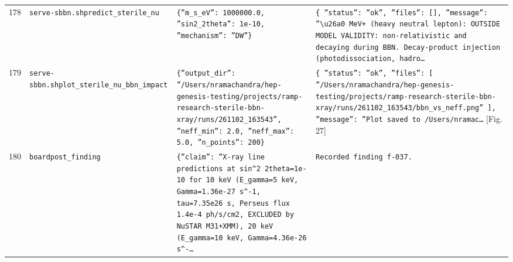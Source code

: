\documentclass[11pt,a4paper]{article}
\begin{document}
\begin{longtable}{@{}p{}p{}p{}p{}@{}}
178 & \texttt{serve-sbbn.sh}\newline\texttt{predict\_\allowbreak{}sterile\_\allowbreak{}nu} & \texttt{\{''m\_\allowbreak{}s\_\allowbreak{}eV'':\allowbreak{} 1000000.0,\allowbreak{} ''sin2\_\allowbreak{}2theta'':\allowbreak{} 1e-10,\allowbreak{} ''mechanism'':\allowbreak{} ''DW''\}\allowbreak{}} & \texttt{\{   ''status'':\allowbreak{} ''ok'',\allowbreak{}   ''files'':\allowbreak{} []\allowbreak{},\allowbreak{}   ''message'':\allowbreak{} ''\textbackslash{}\allowbreak{}u26a0 MeV+ (heavy neutral lepton)\allowbreak{}:\allowbreak{} OUTSIDE MODEL VALIDITY:\allowbreak{} non-relativistic and decaying during BBN. Decay-product injection (photodissociation,\allowbreak{} hadro\ldots{}\allowbreak{}} \\
179 & \texttt{serve-sbbn.sh}\newline\texttt{plot\_\allowbreak{}sterile\_\allowbreak{}nu\_\allowbreak{}bbn\_\allowbreak{}impact} & \texttt{\{''output\_\allowbreak{}dir'':\allowbreak{} ''/\allowbreak{}Users/\allowbreak{}nramachandra/\allowbreak{}hep-genesis-testing/\allowbreak{}projects/\allowbreak{}ramp-research-sterile-bbn-xray/\allowbreak{}runs/\allowbreak{}261102\_\allowbreak{}163543'',\allowbreak{} ''neff\_\allowbreak{}min'':\allowbreak{} 2.0,\allowbreak{} ''neff\_\allowbreak{}max'':\allowbreak{} 5.0,\allowbreak{} ''n\_\allowbreak{}points'':\allowbreak{} 200\}\allowbreak{}} & \texttt{\{   ''status'':\allowbreak{} ''ok'',\allowbreak{}   ''files'':\allowbreak{} [     ''/\allowbreak{}Users/\allowbreak{}nramachandra/\allowbreak{}hep-genesis-testing/\allowbreak{}projects/\allowbreak{}ramp-research-sterile-bbn-xray/\allowbreak{}runs/\allowbreak{}261102\_\allowbreak{}163543/\allowbreak{}bbn\_\allowbreak{}vs\_\allowbreak{}neff.png''   ]\allowbreak{},\allowbreak{}   ''message'':\allowbreak{} ''Plot saved to /\allowbreak{}Users/\allowbreak{}nramac\ldots{}\allowbreak{}} [Fig. 27] \\
180 & \texttt{board}\newline\texttt{post\_\allowbreak{}finding} & \texttt{\{''claim'':\allowbreak{} ''X-ray line predictions at sin\textasciicircum{}\allowbreak{}2 2theta=\allowbreak{}1e-10 for 10 keV (E\_\allowbreak{}gamma=\allowbreak{}5 keV,\allowbreak{} Gamma=\allowbreak{}1.36e-27 s\textasciicircum{}\allowbreak{}-1,\allowbreak{} tau=\allowbreak{}7.35e26 s,\allowbreak{} Perseus flux 1.4e-4 ph/\allowbreak{}s/\allowbreak{}cm2,\allowbreak{} EXCLUDED by NuSTAR M31+XMM)\allowbreak{},\allowbreak{} 20 keV (E\_\allowbreak{}gamma=\allowbreak{}10 keV,\allowbreak{} Gamma=\allowbreak{}4.36e-26 s\textasciicircum{}\allowbreak{}-\ldots{}\allowbreak{}} & \texttt{Recorded finding f-037.} \\

\end{longtable}
\end{document}
